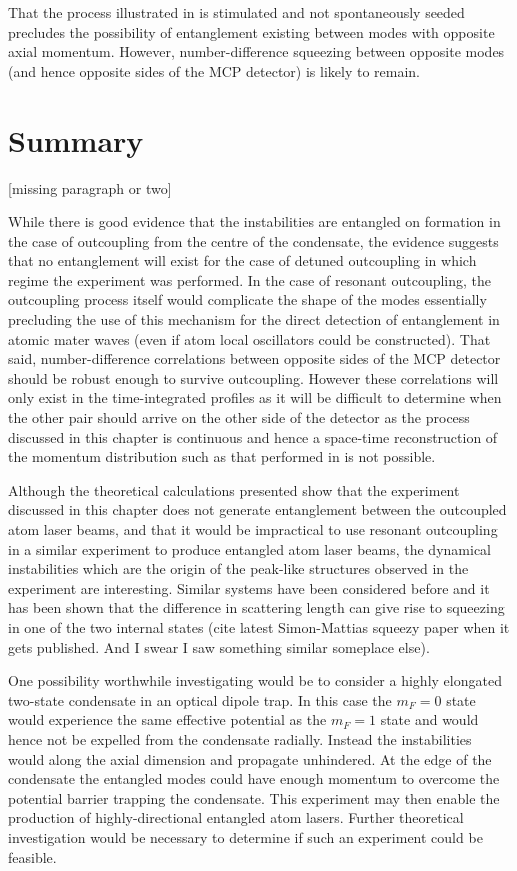 That the process illustrated in  is stimulated and not spontaneously seeded precludes the possibility of entanglement existing between modes with opposite axial momentum. However, number-difference squeezing between opposite modes (and hence opposite sides of the MCP detector) is likely to remain. 

\section{Summary}

[missing paragraph or two]

While there is good evidence that the instabilities are entangled on formation in the case of outcoupling from the centre of the condensate, the evidence suggests that no entanglement will exist for the case of detuned outcoupling in which regime the experiment was performed. In the case of resonant outcoupling, the outcoupling process itself would complicate the shape of the modes essentially precluding the use of this mechanism for the direct detection of entanglement in atomic mater waves (even if  atom local oscillators could be constructed). That said, number-difference correlations between opposite sides of the MCP detector should be robust enough to survive outcoupling. However these correlations will only exist in the time-integrated profiles as it will be difficult to determine when the other pair should arrive on the other side of the detector as the process discussed in this chapter is continuous and hence a space-time reconstruction of the momentum distribution such as that performed in \citep{Perrin:2007} is not possible.

Although the theoretical calculations presented show that the experiment discussed in this chapter does not generate entanglement between the outcoupled atom laser beams, and that it would be impractical to use resonant outcoupling in a similar experiment to produce entangled atom laser beams, the dynamical instabilities which are the origin of the peak-like structures observed in the experiment are interesting. Similar systems have been considered before and it has been shown that the difference in scattering length can give rise to squeezing in one of the two internal states (cite latest Simon-Mattias squeezy paper when it gets published. And I swear I saw something similar someplace else). 

One possibility worthwhile investigating would be to consider a highly elongated two-state condensate in an optical dipole trap. In this case the $m_F=0$ state would experience the same effective potential as the $m_F=1$ state and would hence not be expelled from the condensate radially. Instead the instabilities would along the axial dimension and propagate unhindered. At the edge of the condensate the entangled modes could have enough momentum to overcome the potential barrier trapping the condensate. This experiment may then enable the production of highly-directional entangled atom lasers. Further theoretical investigation would be necessary to determine if such an experiment could be feasible.

